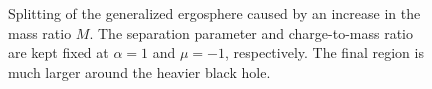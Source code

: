 \begin{figure}[!htbp]
  \centering
  \caption{Splitting of the generalized ergosphere caused by an increase in the mass ratio $M$. The separation parameter and charge-to-mass ratio are kept fixed at $\alpha = 1$ and $\mu = -1$, respectively. The final region is much larger around the heavier black hole.}
  \label{ch:penrose_binaries/fig:splitting_ergosphere_mass_increase}
\end{figure}

